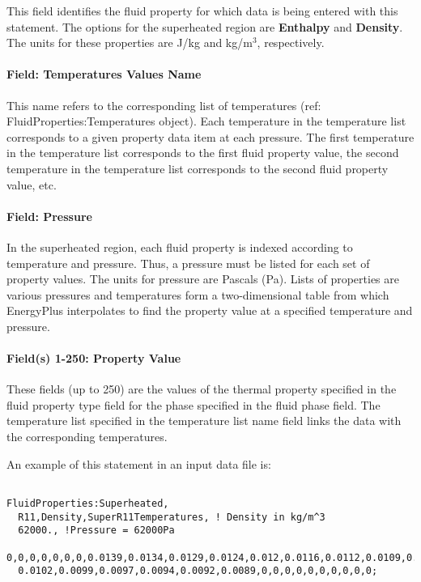 This field identifies the fluid property for which data is being entered with this statement. The options for the superheated region are \textbf{Enthalpy} and \textbf{Density}. The units for these properties are J/kg and kg/m\(^{3}\), respectively.

\paragraph{Field: Temperatures Values Name}\label{field-temperatures-values-name-1}

This name refers to the corresponding list of temperatures (ref: FluidProperties:Temperatures object). Each temperature in the temperature list corresponds to a given property data item at each pressure. The first temperature in the temperature list corresponds to the first fluid property value, the second temperature in the temperature list corresponds to the second fluid property value, etc.

\paragraph{Field: Pressure}\label{field-pressure}

In the superheated region, each fluid property is indexed according to temperature and pressure. Thus, a pressure must be listed for each set of property values. The units for pressure are Pascals (Pa). Lists of properties are various pressures and temperatures form a two-dimensional table from which EnergyPlus interpolates to find the property value at a specified temperature and pressure.

\paragraph{Field(s) 1-250: Property Value}\label{fields-1-250-property-value-1}

These fields (up to 250) are the values of the thermal property specified in the fluid property type field for the phase specified in the fluid phase field. The temperature list specified in the temperature list name field links the data with the corresponding temperatures.

An example of this statement in an input data file is:

\begin{lstlisting}

FluidProperties:Superheated,
  R11,Density,SuperR11Temperatures, ! Density in kg/m^3
  62000., !Pressure = 62000Pa
  0,0,0,0,0,0,0,0.0139,0.0134,0.0129,0.0124,0.012,0.0116,0.0112,0.0109,0.0105,
  0.0102,0.0099,0.0097,0.0094,0.0092,0.0089,0,0,0,0,0,0,0,0,0,0;
\end{lstlisting}

